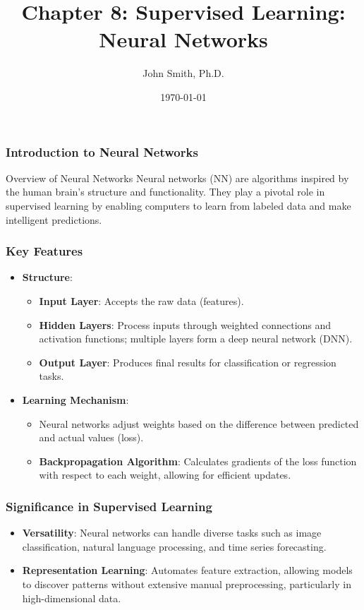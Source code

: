 \documentclass[aspectratio=169]{beamer}
\title[Neural Networks]{Chapter 8: Supervised Learning: Neural Networks}
\author[J. Smith]{John Smith, Ph.D.}
\institute[University Name]{
  Department of Computer Science\\
  University Name\\
  \vspace{0.3cm}
  Email: email@university.edu\\
  Website: www.university.edu
}
\date{\today}
\begin{document}
\frame{\titlepage}

\begin{frame}[fragile]
    \frametitle{Introduction to Neural Networks}
    \begin{block}{Overview of Neural Networks}
        Neural networks (NN) are algorithms inspired by the human brain's structure and functionality. They play a pivotal role in supervised learning by enabling computers to learn from labeled data and make intelligent predictions.
    \end{block}
\end{frame}

\begin{frame}[fragile]
    \frametitle{Key Features}
    \begin{itemize}
        \item \textbf{Structure}:
        \begin{itemize}
            \item \textbf{Input Layer}: Accepts the raw data (features).
            \item \textbf{Hidden Layers}: Process inputs through weighted connections and activation functions; multiple layers form a deep neural network (DNN).
            \item \textbf{Output Layer}: Produces final results for classification or regression tasks.
        \end{itemize}
        
        \item \textbf{Learning Mechanism}:
        \begin{itemize}
            \item Neural networks adjust weights based on the difference between predicted and actual values (loss).
            \item \textbf{Backpropagation Algorithm}: Calculates gradients of the loss function with respect to each weight, allowing for efficient updates.
        \end{itemize}
    \end{itemize}
\end{frame}

\begin{frame}[fragile]
    \frametitle{Significance in Supervised Learning}
    \begin{itemize}
        \item \textbf{Versatility}: Neural networks can handle diverse tasks such as image classification, natural language processing, and time series forecasting.
        \item \textbf{Representation Learning}: Automates feature extraction, allowing models to discover patterns without extensive manual preprocessing, particularly in high-dimensional data.
    \end{itemize}
\end{frame}
\end{document}
